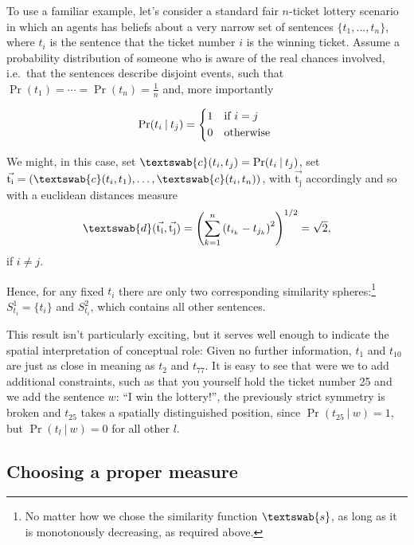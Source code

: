 \documentclass[11pt, a4paper]{scrartcl}
\renewcommand{\v}[1]{\vec{\mathrm{#1}}}
\newcommand{\m}[1]{\textswab{#1}}
\newcommand{\given}[1][]{\:#1\vert\:}
\begin{document}
To use a familiar example, let's consider a standard fair $n$-ticket lottery scenario in which an agents has beliefs about a very narrow set of sentences $\{ t_1, \dots, t_n\}$, where $t_i$ is the sentence that the ticket number $i$ is the winning ticket. Assume a probability distribution of someone who is aware of the real chances involved, i.e.\ that the sentences describe disjoint events, such that $\Pr(t_1) = \cdots = \Pr(t_n) = \frac{1}{n}$ and, more importantly

\[
    \Pr(t_i \given t_j)  =
    \begin{cases*}
        1 & if $i = j$ \\
        0        & otherwise
    \end{cases*}
\]

We might, in this case, set $\m{c}(t_i, t_j) = \Pr(t_i \given t_j)$, set $\v{t_i} = (\m{c}(t_i,t_1),\ldots,\m{c}(t_i,t_n))$, with $\v{t_j}$ accordingly and so with a euclidean distances measure 
\[
    \m{d}(\v{t_i},\v{t_j}) = {\left( \sum_{k=1}^n {(t_{i_k}-t_{j_k})}^2 \right)}^{1/2} = \sqrt{2},  
\]
if $i \not = j$.

Hence, for any fixed $t_i$ there are only two corresponding similarity spheres:\footnote{No matter how we chose the similarity function $\m{s}$, as long as it is monotonously decreasing, as required above.} $S^1_{t_i} = \{ t_i\}$ and $S^2_{t_i}$, which contains all other sentences. 

This result isn't particularly exciting, but it serves well enough to indicate the spatial interpretation of conceptual role: Given no further information, $t_1$ and $t_{10}$ are just as close in meaning as $t_2$ and $t_{77}$. It is easy to see that were we to add additional constraints, such as that you yourself hold the ticket number 25 and we add the sentence $w$: ``I win the lottery!'', the previously strict symmetry is broken and $t_{25}$ takes a spatially distinguished position, since $\Pr(t_{25} \given w) = 1$, but $\Pr(t_l \given w) = 0$ for all other $l$. 

\subsection{Choosing a proper measure}\label{sec:choosing}
\end{document}
